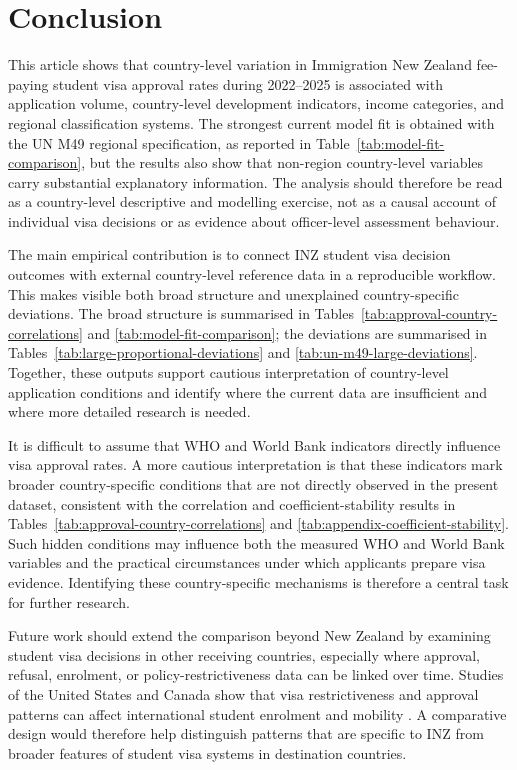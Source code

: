 \documentclass[runningheads]{llncs}
\begin{document}
\section{Conclusion}

This article shows that country-level variation in Immigration New Zealand fee-paying student visa approval rates during 2022--2025 is associated with application volume, country-level development indicators, income categories, and regional classification systems. The strongest current model fit is obtained with the UN M49 regional specification, as reported in Table~\ref{tab:model-fit-comparison}, but the results also show that non-region country-level variables carry substantial explanatory information. The analysis should therefore be read as a country-level descriptive and modelling exercise, not as a causal account of individual visa decisions or as evidence about officer-level assessment behaviour.

The main empirical contribution is to connect INZ student visa decision outcomes with external country-level reference data in a reproducible workflow. This makes visible both broad structure and unexplained country-specific deviations. The broad structure is summarised in Tables~\ref{tab:approval-country-correlations} and \ref{tab:model-fit-comparison}; the deviations are summarised in Tables~\ref{tab:large-proportional-deviations} and \ref{tab:un-m49-large-deviations}. Together, these outputs support cautious interpretation of country-level application conditions and identify where the current data are insufficient and where more detailed research is needed.

It is difficult to assume that WHO and World Bank indicators directly influence visa approval rates. A more cautious interpretation is that these indicators mark broader country-specific conditions that are not directly observed in the present dataset, consistent with the correlation and coefficient-stability results in Tables~\ref{tab:approval-country-correlations} and \ref{tab:appendix-coefficient-stability}. Such hidden conditions may influence both the measured WHO and World Bank variables and the practical circumstances under which applicants prepare visa evidence. Identifying these country-specific mechanisms is therefore a central task for further research.

Future work should extend the comparison beyond New Zealand by examining student visa decisions in other receiving countries, especially where approval, refusal, enrolment, or policy-restrictiveness data can be linked over time. Studies of the United States and Canada show that visa restrictiveness and approval patterns can affect international student enrolment and mobility \cite{Chen2023,Gonnot2025}. A comparative design would therefore help distinguish patterns that are specific to INZ from broader features of student visa systems in destination countries.
\end{document}
